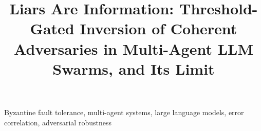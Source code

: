 \documentclass[conference]{IEEEtran}
\begin{document}
\title{Liars Are Information: Threshold-Gated Inversion of Coherent\\Adversaries in Multi-Agent LLM Swarms, and Its Limit}

\author{
}

\maketitle



\begin{IEEEkeywords}
Byzantine fault tolerance, multi-agent systems, large language models,
error correlation, adversarial robustness
\end{IEEEkeywords}




\end{document}
